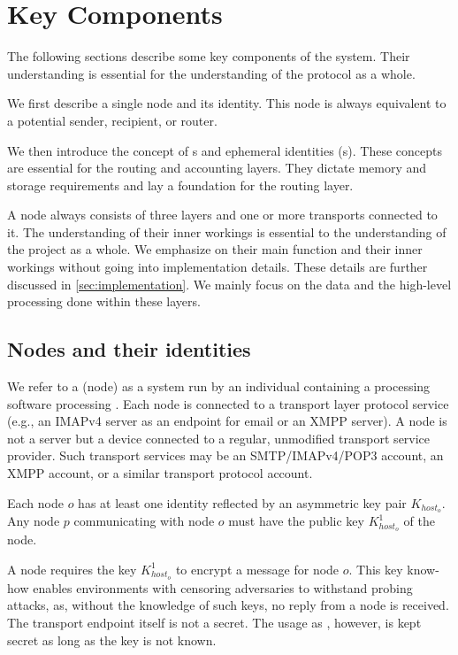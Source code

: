 \section{Key Components}
The following sections describe some key components of the system. Their understanding is essential for the understanding of the protocol as a whole. 

We first describe a single node and its identity. This node is always equivalent to a potential sender, recipient, or router. 

We then introduce the concept of s and ephemeral identities (s). These concepts are essential for the routing and accounting layers. They dictate memory and storage requirements and lay a foundation for the routing layer.

A node always consists of three layers and one or more transports connected to it. The understanding of their inner workings is essential to the understanding of the project as a whole. We emphasize on their main function and their inner workings without going into implementation details. These details are further discussed in \cref{sec:implementation}. We mainly focus on the data and the high-level processing done within these layers.

\subsection{Nodes and their identities}
We refer to a \VortexNode{} (node) as a system run by an individual containing a processing software processing \VortexMessages. Each node is connected to a transport layer protocol service (e.g., an IMAPv4 server as an endpoint for email or an XMPP server). A node is not a server but a device connected to a regular, unmodified transport service provider. Such transport services may be an SMTP/IMAPv4/POP3 account, an XMPP account, or a similar transport protocol account.

Each node $o$ has at least one identity reflected by an asymmetric key pair $K_{host_o}$. Any node $p$ communicating with node $o$ must have the public key  $K^1_{host_o}$ of the node.

A node requires the key $K^1_{host_o}$ to encrypt a message for node $o$. This key know-how enables environments with censoring adversaries to withstand probing attacks, as, without the knowledge of such keys, no reply from a node is received. The transport endpoint itself is not a secret. The usage as \VortexNode, however, is kept secret as long as the key is not known.

